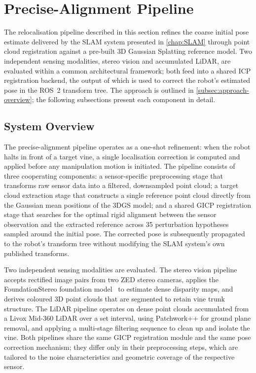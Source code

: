 \section{Precise-Alignment Pipeline}
\label{sec:precise-alignment-methodology}

The relocalisation pipeline described in this section refines the coarse initial pose estimate delivered by the SLAM system presented in \cref{chap:SLAM} through point cloud registration against a pre-built 3D Gaussian Splatting reference model. Two independent sensing modalities, stereo vision and accumulated LiDAR, are evaluated within a common architectural framework; both feed into a shared ICP registration backend, the output of which is used to correct the robot's estimated pose in the ROS~2 transform tree. The approach is outlined in \cref{subsec:approach-overview}; the following subsections present each component in detail.

\subsection{System Overview}
\label{subsec:pa-system-overview}

The precise-alignment pipeline operates as a one-shot refinement: when the robot halts in front of a target vine, a single localisation correction is computed and applied before any manipulation motion is initiated. The pipeline consists of three cooperating components: a sensor-specific preprocessing stage that transforms raw sensor data into a filtered, downsampled point cloud; a target cloud extraction stage that constructs a single reference point cloud directly from the Gaussian mean positions of the 3DGS model; and a shared GICP registration stage that searches for the optimal rigid alignment between the sensor observation and the extracted reference across 35 perturbation hypotheses sampled around the initial pose. The corrected pose is subsequently propagated to the robot's transform tree without modifying the SLAM system's own published transforms.

Two independent sensing modalities are evaluated. The stereo vision pipeline accepts rectified image pairs from two ZED stereo cameras, applies the FoundationStereo foundation model~\cite{wenFoundationStereoZeroShot2025}
to estimate dense disparity maps, and derives coloured 3D point clouds that are segmented to retain vine trunk structure. The LiDAR pipeline operates on dense point clouds accumulated from a Livox Mid-360 LiDAR over a set interval, using Patchwork++ for ground plane removal, and applying a multi-stage filtering sequence to clean up and isolate the vine. Both pipelines share the same GICP registration module and the same pose correction mechanism; they differ only in their preprocessing steps, which are tailored to the noise characteristics and geometric coverage of the respective sensor. 

